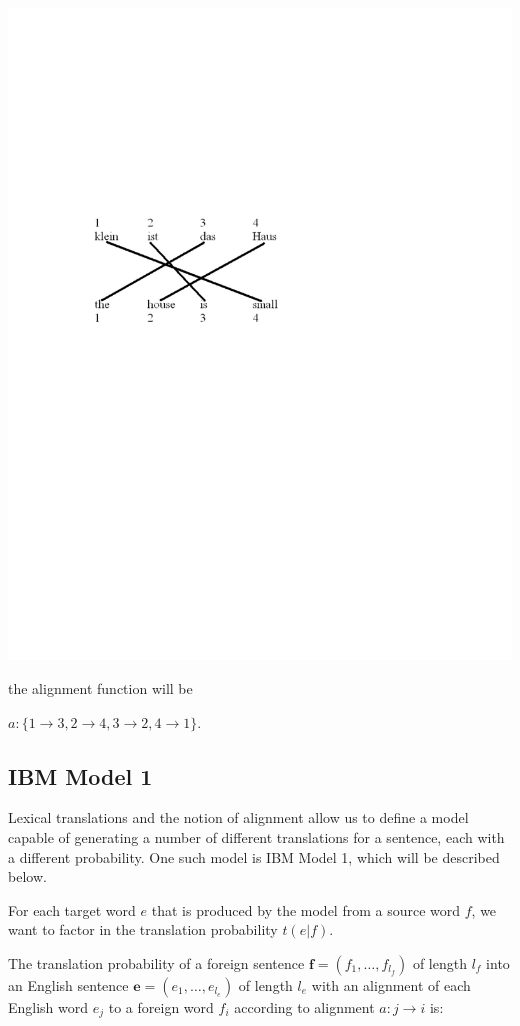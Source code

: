 \documentclass[10pt]{report}
\theoremstyle{plain}
\begin{document}
{\includegraphics[viewport = 100 400 400 550,clip]{constantin-figure2.pdf}

the alignment function will be

$a:\{1 \rightarrow 3, 2 \rightarrow 4, 3 \rightarrow 2, 4
\rightarrow 1\}$.


\subsection{IBM Model 1\\}

Lexical translations and the notion of alignment allow us to define
a model capable of generating a number of different translations for
a sentence, each with a different probability. One such model is IBM
Model 1, which will be described below.

For each target word $e$ that is produced by the model from a source
word $f$, we want to factor in the translation probability $t(e|f)$.

The translation probability of a foreign sentence
$\textbf{f}=(f_1,\dots,f_{l_f})$ of length $l_f$ into an English
sentence $\textbf{e}=(e_1,\dots, e_{l_e})$ of length $l_e$ with an
alignment of each English word $e_j$ to a foreign word $f_i$
according to alignment $a:j \rightarrow i$ is:

}
\end{document}
